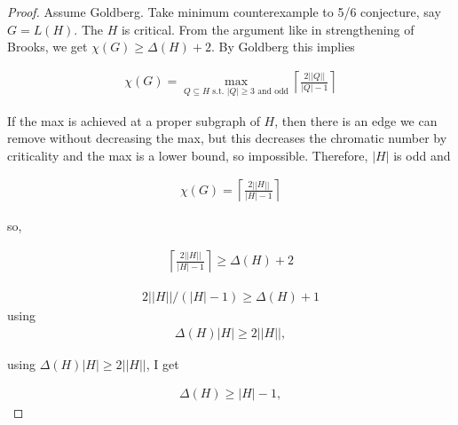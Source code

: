 \documentclass[12pt]{amsart}
\theoremstyle{plain}
\theoremstyle{definition}
\theoremstyle{remark}
\newcommand{\ceil}[1]{\left\lceil#1\right\rceil}
\begin{document}
\begin{proof}
Assume Goldberg.   Take minimum counterexample to 5/6 conjecture, say 
$G = L(H)$.   The $H$ is critical.  From the argument like in strengthening of
Brooks,  we get $\chi(G) \ge \Delta(H) + 2$.  By Goldberg this implies

\begin{align*}
\chi(G) = \max_{Q \subseteq H \mbox{ s.t.~$|Q|\ge 3$ and odd
}}\ceil{\frac{2||Q||}{|Q| - 1}}
\end{align*}

If the max is achieved at a proper subgraph of $H$, then there is an edge we
can remove without decreasing the max, but this decreases the chromatic number
by criticality and the max is a lower bound, so impossible. Therefore, $|H|$ is odd and

\begin{align*}
\chi(G)  =  \ceil{\frac{2||H||}{|H| - 1}}
\end{align*}

so,

\begin{align*}
\ceil{\frac{2||H||}{|H| - 1}} \ge \Delta(H) + 2
\end{align*}

\begin{align*}
2||H|| / (|H| - 1) \ge \Delta(H) + 1
\end{align*}
using 
\begin{align*}
\Delta(H)|H| \ge 2||H||,
\end{align*}

using $\Delta(H)|H| \ge 2||H||$, I get

\begin{align*}
\Delta(H) \ge |H| - 1,
\end{align*}
\end{proof}

%
%
%


\bigskip
\bigskip
\end{document}
